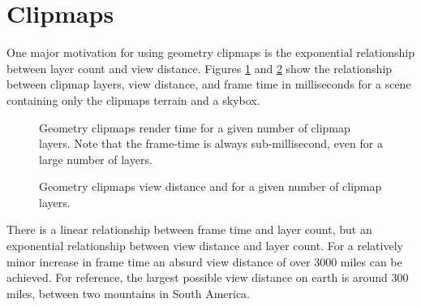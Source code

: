\section{Clipmaps} \label{sec:results_clipmaps}

One major motivation for using geometry clipmaps is the exponential relationship between layer count and view distance.
Figures \ref{fig:clipmaps_plot_1} and \ref{fig:clipmaps_plot_2} show the relationship between clipmap layers, view distance, and frame time in milliseconds for a scene containing only the clipmaps terrain and a skybox.

\begin{figure}
	\centering
{}
	\caption{
		Geometry clipmaps render time for a given number of clipmap layers.
		Note that the frame-time is always sub-millisecond, even for a large number of layers.
	}
	\label{fig:clipmaps_plot_1}
\end{figure}

\begin{figure}
	\centering
{}
	\caption{
		Geometry clipmaps view distance and for a given number of clipmap layers.
	}
	\label{fig:clipmaps_plot_2}
\end{figure}

There is a linear relationship between frame time and layer count, but an exponential relationship between view distance and layer count.
For a relatively minor increase in frame time an absurd view distance of over 3000 miles can be achieved.
For reference, the largest possible view distance on earth is around 300 miles, between two mountains in South America. \cite{viewdistancemaxearth}

